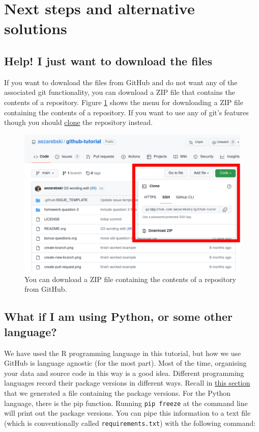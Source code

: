 \documentclass[11pt,onecolumn]{scrartcl}
\begin{document}
\section{Next steps and alternative solutions}
\label{sec:org382c3cd}

\subsection{Help! I just want to download the files}
\label{sec:org56321ce}

If you want to download the files from GitHub and do not want any of the
associated git functionality, you can download a ZIP file that contains the
contents of a repository. Figure \ref{fig:download-zip-file} shows the menu for
downloading a ZIP file containing the contents of a repository. If you want to
use any of git's features though you should \hyperref[sec:orgd1cebee]{clone} the repository instead.

\begin{figure}[htbp]
\centering
\includegraphics[width=.9\linewidth]{./download-zip-file.png}
\caption{\label{fig:download-zip-file}You can download a ZIP file containing the contents of a repository from GitHub.}
\end{figure}

\subsection{What if I am using Python, or some other language?}
\label{sec:org0a27de3}

We have used the R programming language in this tutorial, but how we use GitHub
is language agnostic (for the most part). Most of the time, organising your data
and source code in this way is a good idea. Different programming languages
record their package versions in different ways. Recall in \hyperref[sec:orgb36167d]{this section} that we
generated a file containing the package versions. For the Python language, there
is the pip function. Running \texttt{pip freeze} at the command line will print out the
package versions. You can pipe this information to a text file (which is
conventionally called \texttt{requirements.txt}) with the following command:
\end{document}
